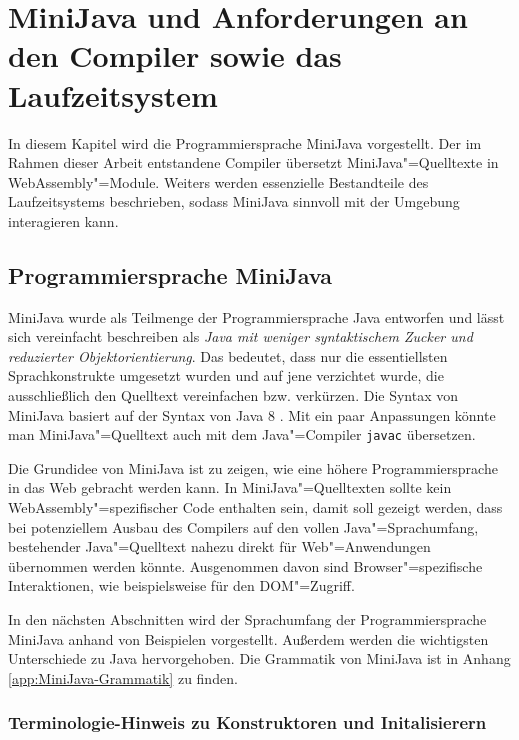 \chapter{MiniJava und Anforderungen an den Compiler sowie das Laufzeitsystem}
\label{cha:MiniJava}

In diesem Kapitel wird die Programmiersprache MiniJava vorgestellt. Der im Rahmen dieser Arbeit entstandene Compiler übersetzt MiniJava"=Quelltexte in WebAssembly"=Module. Weiters werden essenzielle Bestandteile des Laufzeitsystems beschrieben, sodass MiniJava sinnvoll mit der Umgebung interagieren kann.

\section{Programmiersprache MiniJava}
\label{sec:Programmiersprache-MiniJava}

MiniJava wurde als Teilmenge der Programmiersprache Java entworfen und lässt sich vereinfacht beschreiben als \emph{Java mit weniger syntaktischem Zucker und reduzierter Objektorientierung}. Das bedeutet, dass nur die essentiellsten Sprachkonstrukte umgesetzt wurden und auf jene verzichtet wurde, die ausschließlich den Quelltext vereinfachen bzw. verkürzen. Die Syntax von MiniJava basiert auf der Syntax von Java 8 \cite{Java8Specification}. Mit ein paar Anpassungen könnte man MiniJava"=Quelltext auch mit dem Java"=Compiler \lstinline{javac} übersetzen.

Die Grundidee von MiniJava ist zu zeigen, wie eine höhere Programmiersprache in das Web gebracht werden kann. In MiniJava"=Quelltexten sollte kein WebAssembly"=spezifischer Code enthalten sein, damit soll gezeigt werden, dass bei potenziellem Ausbau des Compilers auf den vollen Java"=Sprachumfang, bestehender Java"=Quelltext nahezu direkt für Web"=Anwendungen übernommen werden könnte. Ausgenommen davon sind Browser"=spezifische Interaktionen, wie beispielsweise für den DOM"=Zugriff.

In den nächsten Abschnitten wird der Sprachumfang der Programmiersprache MiniJava anhand von Beispielen vorgestellt. Außerdem werden die wichtigsten Unterschiede zu Java hervorgehoben. Die Grammatik von MiniJava ist in Anhang \ref{app:MiniJava-Grammatik} zu finden.

\pagebreak
\subsection{Terminologie-Hinweis zu Konstruktoren und Initalisierern}


